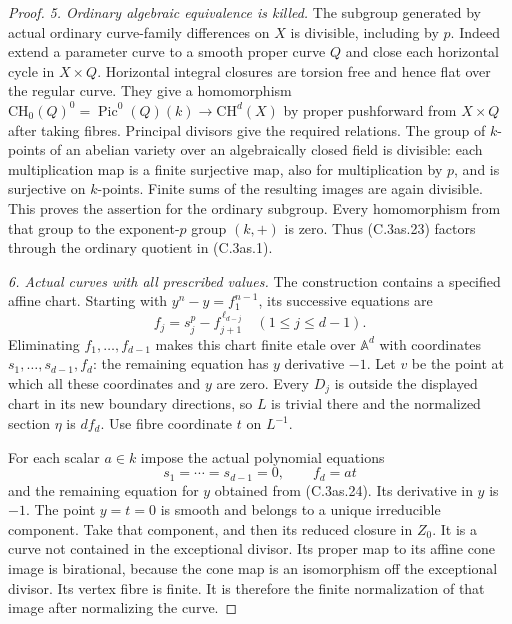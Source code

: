 \begin{proof}
\emph{5. Ordinary algebraic equivalence is killed.}
The subgroup generated by actual ordinary curve-family
differences on $X$ is divisible, including by $p$.
Indeed extend a parameter curve to a smooth proper curve
$Q$ and close each horizontal cycle in $X\times Q$.
Horizontal integral closures are torsion free and hence
flat over the regular curve. They give a homomorphism
$\mathrm{CH}_0(Q)^0=\operatorname{Pic}^0(Q)(k)\to
\mathrm{CH}^d(X)$ by proper pushforward from $X\times Q$
after taking fibres. Principal divisors give the required
relations. The group of $k$-points of an abelian variety
over an algebraically closed field is divisible: each
multiplication map is a finite surjective map, also for
multiplication by $p$, and is surjective on $k$-points.
Finite sums of the resulting images are again divisible.
This proves the assertion for the ordinary subgroup.
Every homomorphism from that group to the exponent-$p$
group $(k,+)$ is zero. Thus (C.3as.23) factors through
the ordinary quotient in (C.3as.1).

\emph{6. Actual curves with all prescribed values.}
The construction contains a specified affine chart.
Starting with $y^n-y=f_1^{n-1}$, its successive equations are
\[
              f_j=s_j^p-f_{j+1}^{\,\ell_{d-j}}
                      \quad(1\le j\le d-1).
 \tag{C.3as.24}
\]
Eliminating $f_1,\ldots,f_{d-1}$ makes this chart finite
etale over $\mathbb A^d$ with coordinates
$s_1,\ldots,s_{d-1},f_d$: the remaining equation has
$y$ derivative $-1$. Let $v$ be the point at which all
these coordinates and $y$ are zero. Every $D_j$ is outside
the displayed chart in its new boundary directions, so
$L$ is trivial there and the normalized section $\eta$
is $df_d$. Use fibre coordinate $t$ on $L^{-1}$.

For each scalar $a\in k$ impose the actual polynomial
equations
\[
                      s_1=\cdots=s_{d-1}=0,\qquad f_d=at
 \tag{C.3as.25}
\]
and the remaining equation for $y$ obtained from (C.3as.24).
Its derivative in $y$ is $-1$. The point $y=t=0$ is
smooth and belongs to a unique irreducible component.
Take that component, and then its reduced closure in
$Z_0$. It is a curve not contained in the exceptional
divisor. Its proper map to its affine cone image is
birational, because the cone map is an isomorphism off
the exceptional divisor. Its vertex fibre is finite.
It is therefore the finite normalization of that image
after normalizing the curve.


\end{proof}
